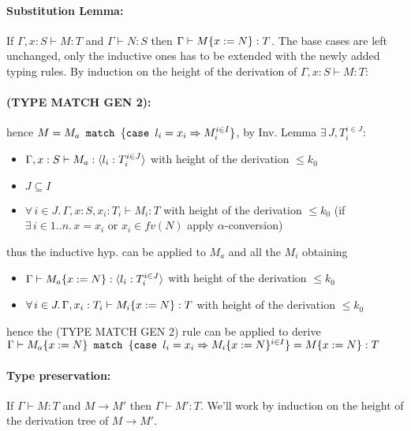 \paragraph*{Substitution Lemma:\\}
If \(\Gamma, x: S \vdash M: T\) and \(\Gamma \vdash N: S\) then
\(\Gamma \vdash M\{x:=N\}: T\).  The base cases are left
unchanged, only the inductive ones has to be extended with the newly
added typing rules.  By induction on the height of the derivation of
\(\Gamma, x: S \vdash M: T\):
\paragraph*{\textmd{(TYPE MATCH GEN 2):}}
hence \(M = M_a\texttt{ match }\{\texttt{case }l_i = x_i \Rightarrow M_i^{i \in I}\}\), by
Inv. Lemma \(\exists\, J, T_i^{i \in J}\):
\begin{itemize}
\item \(\Gamma, x: S \vdash M_a: \langle l_i: T_i^{i \in J} \rangle\) with
  height of the derivation \(\le k_0\)
\item \(J \subseteq I\)
\item \(\forall\, i \in J.\, \Gamma, x: S, x_i: T_i \vdash M_i: T\)
  with height of the derivation \(\le k_0\) (if \(\exists\, i \in
  1..n.\, x = x_i\) or \(x_i \in fv(N)\) apply \(\alpha\)-conversion)
\end{itemize}
thus the inductive hyp. can be applied to \(M_a\) and all the \(M_i\)
obtaining
\begin{itemize}
\item \(\Gamma \vdash M_a\{x:=N\}: \langle l_i: T_i^{i \in J} \rangle\)
  with height of the derivation \(\le k_0\)
\item \(\forall\, i \in J.\, \Gamma, x_i: T_i \vdash M_i\{x:=N\}:
  T\) with height of the derivation \(\le k_0\)
\end{itemize}
hence the (TYPE MATCH GEN 2) rule can be applied to derive \(\Gamma
\vdash M_a\{x:=N\}\texttt{ match }\{\texttt{case }l_i = x_i \Rightarrow M_i\{x:=N\}^{i \in
      I}\} = M\{x:=N\}: T\)

\paragraph*{Type preservation:\\}
If \(\Gamma \vdash M: T\) and \(M \to M'\) then \(\Gamma \vdash M':
T\). We'll work by induction on the height of the derivation tree of
\(M \to M'\).

